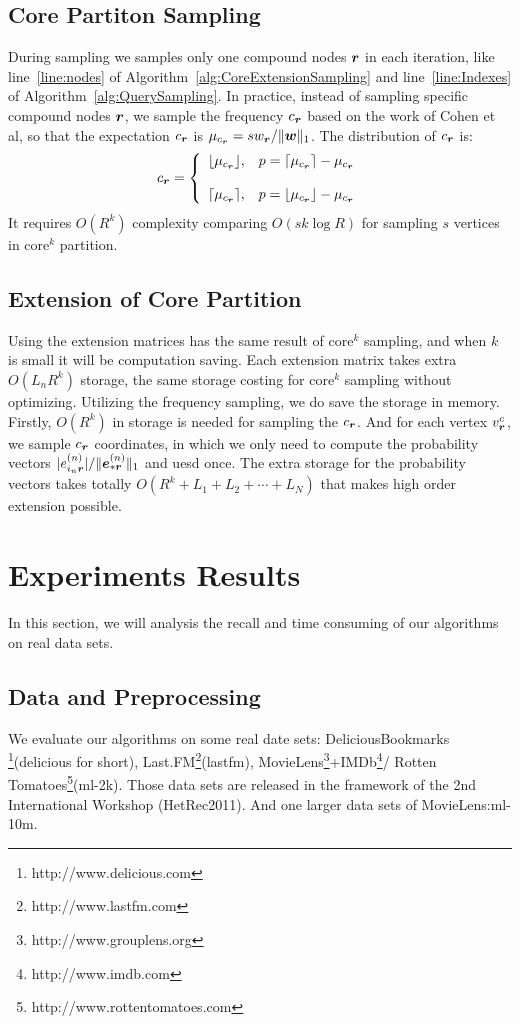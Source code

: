 \documentclass[letterpaper]{article}
\newcommand{\Sca}[3]{{#1}^{(#2)}_{i_#2#3}}%
\newcommand{\V}[1]{{\boldsymbol{{\MakeLowercase{#1}}}}}
\newcommand{\VnC}[3]{\V{#1}^{(#2)}_{#3}}
\newcommand{\norm}[2]{\|#1\|_{#2}}
\newcommand{\AlgLine}[2]{line~\ref{line:#2} of Algorithm~\ref{alg:#1}}
\begin{document}
\subsection{Core Partiton Sampling}
During sampling we samples only one compound nodes $\V{r}$ in each iteration,
like \AlgLine{CoreExtensionSampling}{nodes} and \AlgLine{QuerySampling}{Indexes}.
In practice, instead of sampling specific compound nodes $\V{r}$, 
we sample the frequency $c_\V{r}$ based on the work of Cohen et al,
so that the expectation $c_\V{r}$ is $\mu_{c_\V{r}}=sw_\V{r}/\norm{\V{w}}{1}$.
The distribution of $c_\V{r}$ is:
\begin{equation*}c_\V{r}=
    \left\{
      \begin{array}{ll}
        \lfloor \mu_{c_\V{r}} \rfloor,
        & \hbox{$p=\lceil \mu_{c_\V{r}} \rceil - \mu_{c_\V{r}}$} \\\\
        \lceil \mu_{c_\V{r}} \rceil,
        & \hbox{$p=\lfloor \mu_{c_\V{r}} \rfloor - \mu_{c_\V{r}}$}
      \end{array}
    \right.
\end{equation*}
It requires $O(R^k)$ complexity comparing $O(sk\log{R})$
for sampling $s$ vertices in core$^k$ partition.
\subsection{Extension of Core Partition}
Using the extension matrices has the same result of core$^k$ sampling,
and when $k$ is small it will be computation saving.
Each extension matrix takes extra $O(L_nR^k)$ storage,
the same storage costing for core$^k$ sampling without optimizing.
Utilizing the frequency sampling, we do save the storage in memory.
Firstly, $O(R^k)$ in storage is needed for sampling the $c_\V{r}$.
And for each vertex $v^c_{\V{r}}$,
we sample $c_{\V{r}}$ coordinates,
in which we only need to compute the probability vectors
$|\Sca{e}{n}{\V{r}}|/\norm{\VnC{e}{n}{*\V{r}}}{1}$ and uesd once.
The extra storage for the probability vectors takes totally
$O(R^k + L_1 + L_2 + \cdots + L_N)$
that makes high order extension possible.
\section{Experiments Results}
In this section, we will analysis the recall
and time consuming of our algorithms on real data sets.

\subsection{Data and Preprocessing}
We evaluate our algorithms on some real date sets:
DeliciousBookmarks
\footnote{http://www.delicious.com}(delicious for short),
Last.FM\footnote{http://www.lastfm.com}(lastfm),
MovieLens\footnote{http://www.grouplens.org}+IMDb\footnote{http://www.imdb.com }/
Rotten Tomatoes\footnote{http://www.rottentomatoes.com}(ml-2k).
Those data sets are released in the framework of the 2nd International Workshop (HetRec2011).
And one larger data sets of MovieLens\cite{Harper2015}:ml-10m.
\end{document}
